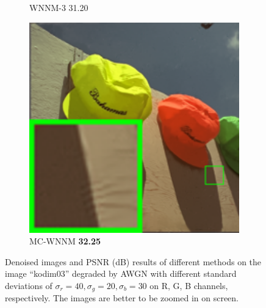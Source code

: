 \begin{figure}
\begin{subfigure}[t]{0.19\textwidth}
		\caption{WNNM-3 31.20}
    \end{subfigure}
    \hfill
    \begin{subfigure}[t]{0.19\textwidth}
        \centering
        \includegraphics[width=1\textwidth]{images/mcwnnm/24images/resize_br_CWNNM_ADMM_nSig402030_kodim03.png}
		\caption{MC-WNNM \textbf{32.25}}
    \end{subfigure}
    \caption{Denoised images and PSNR (dB) results of different methods on the image ``kodim03'' degraded by AWGN with different standard deviations of $\sigma_{r}=40, \sigma_{g}=20, \sigma_{b}=30$ on R, G, B channels, respectively. The images are better to be zoomed in on screen.}
    \label{fig4-4}
\end{figure}

